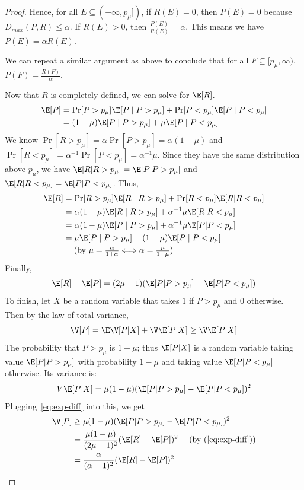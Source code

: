 \begin{proof}
Hence, for all $E \subseteq (-\infty, p_\mu])$, if $R(E) = 0$, then $P(E) = 0$ because $D_{max}(P,R) \leq \alpha$. If $R(E) > 0$, then $\frac{P(E)}{R(E)} = \alpha$. This means
we have $P(E) = \alpha R(E)$. 

We can repeat a similar argument as above to conclude that for all $F \subseteq [p_\mu, \infty)$, $P(F) = \frac{R(F)}{\alpha}$.

Now that $R$ is completely defined, we can solve for $\E[R]$.
\begin{align*}
    \E[P] &= \Pr[P > p_\mu] \E[P \mid P > p_\mu] + \Pr[P < p_\mu] \E[P \mid P < p_\mu] \\
    &= (1-\mu) \E[P \mid P > p_\mu] + \mu \E[P \mid P < p_\mu]
\end{align*}
We know $\Pr[R > p_\mu] = \alpha \Pr[P > p_\mu] = \alpha(1-\mu)$ and $\Pr[R <
p_\mu] = \alpha^{-1} \Pr[P < p_\mu] = \alpha^{-1}\mu$. Since they have the same
distribution above $p_\mu$, we have $\E[R | R > p_\mu] = \E[P | P > p_\mu]$ and
$\E[R | R < p_\mu] = \E[P | P < p_\mu]$. Thus,
\begin{align*}
    \E[R] &= \Pr[R > p_\mu] \E[R \mid R > p_\mu] + \Pr[R < p_\mu] \E[R | R < p_\mu]\\
    &= \alpha(1-\mu) \E[R \mid R > p_\mu] + \alpha^{-1} \mu \E[R | R < p_\mu] \\
    &= \alpha(1-\mu) \E[P \mid P > p_\mu] + \alpha^{-1} \mu \E[P | P < p_\mu] \\
    &= \mu \E[P \mid P > p_\mu] + (1-\mu) \E[P \mid P < p_\mu] \\
    &\hspace{4.5mm} \text{(by $\textstyle{\mu=\frac{\alpha}{1+\alpha} \Longleftrightarrow \alpha = \frac{\mu}{1-\mu}}$)}
\end{align*}
Finally,
\begin{equation}\label{eq:exp-diff}
    \E[R] - \E[P] = (2\mu - 1)(\E[P | P > p_\mu] - \E[P | P < p_\mu])
\end{equation}
To finish, 
let $X$ be a random variable that takes $1$ if $P > p_\mu$ and $0$ otherwise. Then 
by the law of total variance,
\[
\V[P] = \E\V[P | X] + \V\E[P | X] \geq \V \E[P | X]
\]
The probability that $P > p_\mu$ is $1-\mu$; thus 
$\E[P | X]$
is a random variable taking value $\E[P | P > p_\mu]$ with probability $1-\mu$
and taking value $\E[P | P < p_\mu]$ otherwise. Its variance is:
\[
V \E[P | X]
= \mu (1-\mu)(\E[P|P > p_\mu] - \E[P|P < p_\mu])^2
\]
Plugging~\eqref{eq:exp-diff} into this, we get
\begin{align*}
\V[P] &\geq\mu (1-\mu)(\E[P|P > p_\mu] - \E[P|P < p_\mu])^2 \\
&= \frac{\mu(1-\mu)}{(2\mu-1)^2}(\E[R] - \E[P])^2 ~~~~ \text{(by (\ref{eq:exp-diff}))}\\
&= \frac{\alpha}{(\alpha-1)^2}(\E[R] - \E[P])^2
\end{align*}
\end{proof}

